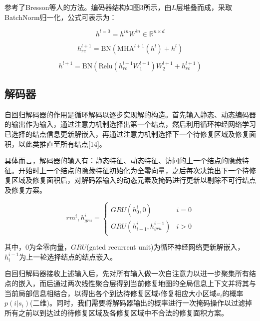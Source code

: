 \documentclass[AutoFakeBold]{LZUThesis}
\begin{document}
参考了Bresson\cite{bresson2021transformer}等人的方法。编码器结构如图3所示，由$L$层堆叠而成，采取BatchNorm归一化，公式可表示为：

\begin{equation}
	h^{l=0} = h^{in} W^{in} \in \mathbb{R}^{n \times d}
	\label{eq:13a}
\end{equation}

\begin{equation}
	h_{rc}^{l+1} = \text{BN}\left(\text{MHA}^{l+1}(h^l) + h^l\right)
	\label{eq:13b}
\end{equation}

\begin{equation}
	h^{l+1} = \text{BN}\left(\text{Relu}\left(h_{rc}^{l+1} W_1^{l+1}\right) W_2^{l+1} + h_{rc}^{l+1}\right)
	\label{eq:13c}
\end{equation}

\subsection{解码器}

自回归解码器的作用是循环解码以逐步实现解的构造。首先输入静态、动态编码器的输出作为输入，通过注意力机制选择出第一个结点，然后利用循环神经网络学习已选择的结点信息更新解嵌入，再通过注意力机制选择下一个待修复区域及修复面积，以此类推直至所有结点[14]。

具体而言，解码器的输入有：静态特征、动态特征、访问的上一个结点的隐藏特征。开始时上一个结点的隐藏特征初始化为全零向量，之后每次决策出下一个待修复区域及修复面积后，对解码器输入的动态元素及掩码进行更新以剔除不可行结点及修复方案。



\begin{equation}
	rm^{i}, h_{gru}^{i} =
	\left\{
	\begin{array}{ll}
		GRU(h_{0}^{i}, 0)               & i = 0 \\
		GRU(h_{i-1}^{i}, h_{gru}^{i-1}) & i > 0
	\end{array}
	\right.
	\label{eq:14}
\end{equation}

其中，$0$为全零向量，$GRU$(gated recurrent unit)为循环神经网络更新解嵌入，$h_i^{i-1}$为上一轮选择结点的结点嵌入。

自回归解码器接收上述输入后，先对所有输入做一次自注意力以进一步聚集所有结点的嵌入，而后通过两次线性聚合层得到当前修复地图的全局信息上下文并将其与当前局部信息相结合，以得出各个到达待修复区域$i$修复相应大小区域$a_i$的概率$p(i|s_i)$(二维)。同时，我们需要将解码器输出的概率进行一次掩码操作以过滤掉所有之前以到达过的待修复区域及各修复区域中不合法的修复面积方案。
\end{document}

